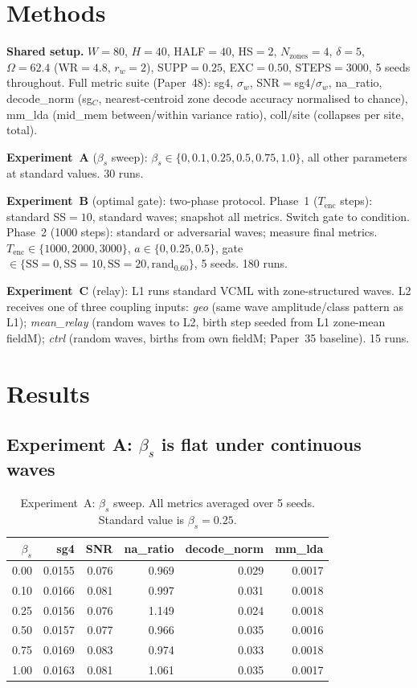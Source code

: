 \documentclass[11pt,a4paper]{article}
\begin{document}
\section{Methods}

\textbf{Shared setup.} $W{=}80$, $H{=}40$, HALF$=40$, HS$=2$, $N_\mathrm{zones}=4$,
$\delta=5$, $\Omega=62.4$ (WR$=4.8$, $r_w=2$), SUPP$=0.25$, EXC$=0.50$, STEPS$=3000$,
5 seeds throughout.
Full metric suite (Paper~48): sg4, $\sigma_w$, SNR$=$sg4$/\sigma_w$, na\_ratio,
decode\_norm (sg$_C$, nearest-centroid zone decode accuracy normalised to chance),
mm\_lda (mid\_mem between/within variance ratio), coll/site (collapses per site, total).

\textbf{Experiment~A} ($\beta_s$ sweep): $\beta_s \in \{0, 0.1, 0.25, 0.5, 0.75, 1.0\}$,
all other parameters at standard values. 30 runs.

\textbf{Experiment~B} (optimal gate): two-phase protocol.
Phase~1 ($T_\mathrm{enc}$ steps): standard SS$=10$, standard waves; snapshot all metrics.
Switch gate to condition.
Phase~2 (1000 steps): standard or adversarial waves; measure final metrics.
$T_\mathrm{enc} \in \{1000, 2000, 3000\}$,
$a \in \{0, 0.25, 0.5\}$,
gate $\in \{\mathrm{SS}{=}0, \mathrm{SS}{=}10, \mathrm{SS}{=}20, \mathrm{rand}_{0.60}\}$,
5 seeds. 180 runs.

\textbf{Experiment~C} (relay): L1 runs standard VCML with zone-structured waves.
L2 receives one of three coupling inputs:
\emph{geo} (same wave amplitude/class pattern as L1);
\emph{mean\_relay} (random waves to L2, birth step seeded from L1 zone-mean fieldM);
\emph{ctrl} (random waves, births from own fieldM; Paper~35 baseline).
15 runs.

\section{Results}

\subsection{Experiment A: $\beta_s$ is flat under continuous waves}

\begin{table}[h]
\centering
\caption{Experiment~A: $\beta_s$ sweep. All metrics averaged over 5 seeds.
Standard value is $\beta_s = 0.25$.}
\label{tab:expa}
\begin{tabular}{rrrrrr}
\toprule
$\beta_s$ & sg4 & SNR & na\_ratio & decode\_norm & mm\_lda \\
\midrule
0.00 & 0.0155 & 0.076 & 0.969 & 0.029 & 0.0017 \\
0.10 & 0.0166 & 0.081 & 0.997 & 0.031 & 0.0018 \\
0.25 & 0.0156 & 0.076 & 1.149 & 0.024 & 0.0018 \\
0.50 & 0.0157 & 0.077 & 0.966 & 0.035 & 0.0016 \\
0.75 & 0.0169 & 0.083 & 0.974 & 0.033 & 0.0018 \\
1.00 & 0.0163 & 0.081 & 1.061 & 0.035 & 0.0017 \\
\bottomrule
\end{tabular}
\end{table}
\end{document}
